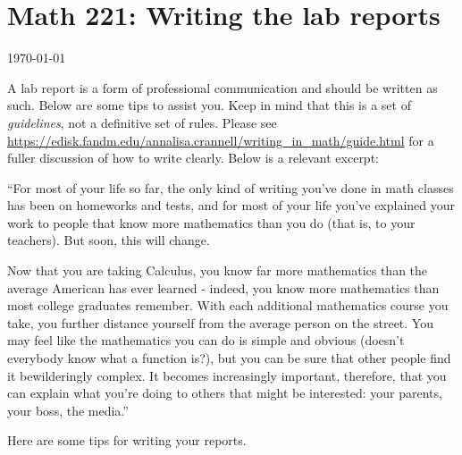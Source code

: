 \documentclass[12pt]{article}
\theoremstyle{definition}
\begin{document}
\section*{Math 221: Writing the lab reports}
\today
\vspace{.1in}

A lab report is a form of professional communication and should be written as such.  Below are some tips to assist you.  Keep in mind that this is a set of \textit{guidelines}, not a definitive set of rules.  Please see
\url{https://edisk.fandm.edu/annalisa.crannell/writing_in_math/guide.html}
for a fuller discussion of how to write clearly.  Below is a relevant excerpt:

\vspace{.1in}

``For most of your life so far, the only kind of writing you've done in math classes has been on homeworks and tests, and for most of your life you've explained your work to people that know more mathematics than you do (that is, to your teachers). But soon, this will change.

Now that you are taking Calculus, you know far more mathematics than the average American has ever learned - indeed, you know more mathematics than most college graduates remember. With each additional mathematics course you take, you further distance yourself from the average person on the street. You may feel like the mathematics you can do is simple and obvious (doesn't everybody know what a function is?), but you can be sure that other people find it bewilderingly complex. It becomes increasingly important, therefore, that you can explain what you're doing to others that might be interested: your parents, your boss, the media.''

\vspace{.1in}

Here are some tips for writing your reports.
\end{document}
